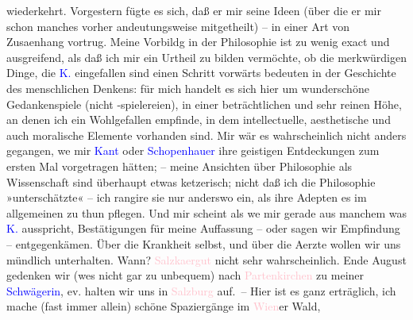                wiederkehrt. Vorgestern fügte es sich, daß er mir seine Ideen (über die er mir schon
               manches vorher andeutungsweise mitgetheilt) – in einer Art von Zusa{\geminationm}enhang vortrug. Meine \strikeout{\textcolor{gray}{×}\-\textcolor{gray}{×}\-\textcolor{gray}{×}\-\textcolor{gray}{×}\-\textcolor{gray}{×}} Vorbildg in der Philosophie \introOben{}ist\introOben{} zu wenig exact und
               ausgreifend, als daß ich mir ein Urtheil zu bilden vermöchte, ob die merkwürdigen
               Dinge, die \textcolor{blue}{K.}{}\ledrightnote{\textcolor{blue}{Arthur Kaufmann}} eingefallen sind einen Schritt
               vorwärts bedeuten in der Geschichte des menschlichen Denkens: für mich handelt es
               sich hier um wunderschöne Gedankenspiele (nicht -spielereien), in einer
               beträchtlichen und sehr reinen Höhe, an denen ich ein Wohlgefallen empfinde, in dem
                   intellectuelle, aesthetische und auch moralische
               Elemente vorhanden sind. Mir wär es wahrscheinlich nicht anders gegangen, we{\geminationn} mir \textcolor{blue}{Kant}{}\ledrightnote{\textcolor{blue}{Immanuel Kant}} oder \textcolor{blue}{Schopenhauer}{}\ledrightnote{\textcolor{blue}{Arthur Schopenhauer}} ihre geistigen Entdeckungen zum ersten
               Mal vorgetragen hätten; – meine Ansichten über Philosophie als Wissenschaft {\pb}sind überhaupt etwas ketzerisch; nicht daß ich die
               Philosophie »unterschätzte« – ich rangire sie nur anderswo ein, als ihre Adepten es
               im allgemeinen zu thun pflegen. Und mir scheint als we{\geminationn}
               mir gerade aus manchem was \textcolor{blue}{K.}{}\ledrightnote{\textcolor{blue}{Arthur Kaufmann}} ausspricht,
               Bestätigungen für meine Auffassung – oder sagen wir Empfindung – entgegenkämen. Über
               die Krankheit selbst, und über die Aerzte wollen wir uns mündlich unterhalten. Wann?
                  \textcolor{pink}{Salzka{\geminationm}ergut}{}\ledrightnote{\textcolor{pink}{Salzkammergut}} nicht
               sehr wahrscheinlich. Ende August gedenken wir (we{\geminationn}s nicht gar zu unbequem) nach \textcolor{pink}{Partenkirchen}{}\ledrightnote{\textcolor{pink}{Partenkirchen}} zu meiner \textcolor{blue}{Schwägerin}{}, ev. halten wir uns in \textcolor{pink}{Salzburg}{}\ledrightnote{\textcolor{pink}{Salzburg}} auf. – Hier ist es ganz erträglich, ich mache (fast
               immer allein) schöne Spaziergänge im \textcolor{pink}{Wien}{}\ledrightnote{\textcolor{pink}{Wien}}er Wald,
